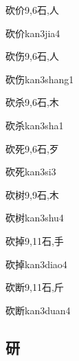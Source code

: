 \begin{Entry}{砍价}{9,6}{⽯,⼈}
  \begin{Phonetics}{砍价}{kan3jia4}
  \end{Phonetics}
\end{Entry}

\begin{Entry}{砍伤}{9,6}{⽯,⼈}
  \begin{Phonetics}{砍伤}{kan3shang1}
  \end{Phonetics}
\end{Entry}

\begin{Entry}{砍杀}{9,6}{⽯,⽊}
  \begin{Phonetics}{砍杀}{kan3sha1}
  \end{Phonetics}
\end{Entry}

\begin{Entry}{砍死}{9,6}{⽯,⽍}
  \begin{Phonetics}{砍死}{kan3si3}
  \end{Phonetics}
\end{Entry}

\begin{Entry}{砍树}{9,9}{⽯,⽊}
  \begin{Phonetics}{砍树}{kan3shu4}
  \end{Phonetics}
\end{Entry}

\begin{Entry}{砍掉}{9,11}{⽯,⼿}
  \begin{Phonetics}{砍掉}{kan3diao4}
  \end{Phonetics}
\end{Entry}

\begin{Entry}{砍断}{9,11}{⽯,⽄}
  \begin{Phonetics}{砍断}{kan3duan4}
  \end{Phonetics}
\end{Entry}

\subsection*{研}


